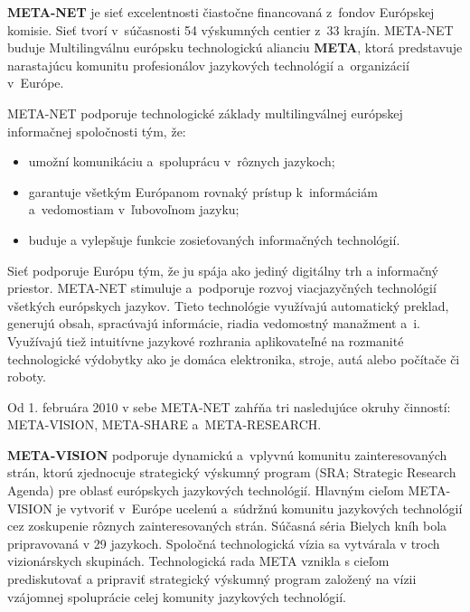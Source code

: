 \begin{multicols}{2}

{\bf META-NET} je sieť excelentnosti čiastočne financovaná z~fondov Európskej komisie. Sieť tvorí v~súčasnosti 54 výskumných centier z~33 krajín\cite{rehm2011}. META-NET buduje Multilingválnu európsku technologickú alianciu {\bf META}, ktorá predstavuje narastajúcu komunitu profesionálov jazykových technológií a~organizácií v~Európe.


META-NET podporuje technologické základy multilingválnej európskej informačnej spoločnosti tým, že:

\begin{itemize}
\item umožní komunikáciu a~spoluprácu v~rôznych jazykoch;
\item garantuje všetkým Európanom rovnaký prístup k~informáciám a~vedomostiam v~ľubovoľnom jazyku;
\item buduje a vylepšuje funkcie zosieťovaných informačných technológií. 
\end{itemize}

Sieť podporuje Európu tým, že ju spája ako jediný digitálny trh a informačný priestor. META-NET stimuluje a~podporuje rozvoj viacjazyčných technológií všetkých európskych jazykov. Tieto technológie využívajú automatický preklad, generujú obsah, spracúvajú informácie, riadia vedomostný manažment a~i. Využívajú tiež intuitívne jazykové rozhrania aplikovateľné na rozmanité technologické výdobytky ako je domáca elektronika, stroje, autá alebo počítače či roboty.

Od 1. februára 2010 v sebe META-NET zahŕňa tri nasledujúce okruhy činností: META-VISION, META-SHARE a~META-RESEARCH. 

{\bf META-VISION} podporuje dynamickú a~vplyvnú komunitu zainteresovaných strán, ktorú zjednocuje strategický výskumný program (SRA; Strategic Research Agenda) pre oblasť európskych jazykových technológií. Hlavným cieľom META-VISION je vytvoriť v~Európe ucelenú a~súdržnú komunitu jazykových technológií cez zoskupenie rôznych zainteresovaných strán. Súčasná séria Bielych kníh bola pripravovaná v 29 jazykoch. Spoločná technologická vízia sa vytvárala v troch vizionárskych skupinách. Technologická rada META vznikla s cieľom prediskutovať a pripraviť strategický výskumný program založený na vízii vzájomnej spoluprácie celej komunity jazykových technológií.


\end{multicols}

